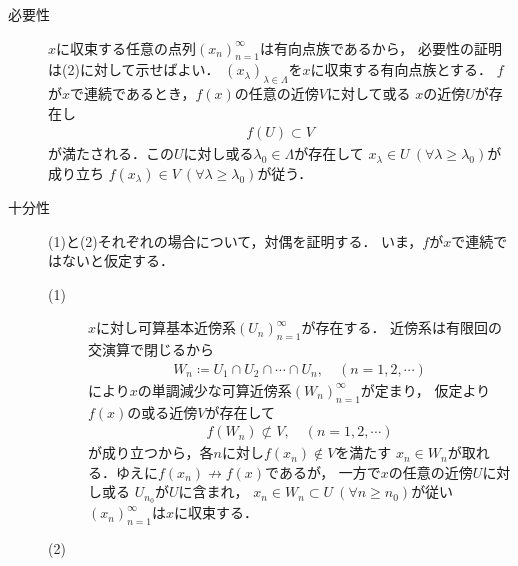 	\begin{prf}\mbox{}
		\begin{description}
			\item[必要性]
				$x$に収束する任意の点列$(x_n)_{n=1}^{\infty}$は有向点族であるから，
				必要性の証明は(2)に対して示せばよい．
				$(x_\lambda)_{\lambda \in \Lambda}$を$x$に収束する有向点族とする．
				$f$が$x$で連続であるとき，$f(x)$の任意の近傍$V$に対して或る
				$x$の近傍$U$が存在し
				\begin{align}
					f(U) \subset V
				\end{align}
				が満たされる．この$U$に対し或る$\lambda_0 \in \Lambda$が存在して
				$x_\lambda \in U\ (\forall \lambda \geq \lambda_0)$が成り立ち
				$f(x_\lambda) \in V\ (\forall \lambda \geq \lambda_0)$が従う．
				
			\item[十分性] (1)と(2)それぞれの場合について，対偶を証明する．
				いま，$f$が$x$で連続ではないと仮定する．
				\begin{description}
					\item[(1)]
						$x$に対し可算基本近傍系$(U_n)_{n=1}^{\infty}$が存在する．
						近傍系は有限回の交演算で閉じるから
						\begin{align}
							W_n \coloneqq U_1 \cap U_2 \cap \cdots \cap U_n,
							\quad (n=1,2,\cdots)
						\end{align}
						により$x$の単調減少な可算近傍系$(W_n)_{n=1}^{\infty}$が定まり，
						仮定より$f(x)$の或る近傍$V$が存在して
						\begin{align}
							f(W_n) \not\subset V,
							\quad (n=1,2,\cdots)
						\end{align}
						が成り立つから，各$n$に対し$f(x_n) \notin V$を満たす
						$x_n \in W_n$が取れる．ゆえに$f(x_n) \not\rightarrow f(x)$であるが，
						一方で$x$の任意の近傍$U$に対し或る
						$U_{n_0}$が$U$に含まれ，
						$x_n \in W_n \subset U\ (\forall n \geq n_0)$が従い
						$(x_n)_{n=1}^{\infty}$は$x$に収束する．
					\item[(2)]
				\end{description}
		\end{description}
	\end{prf}
	